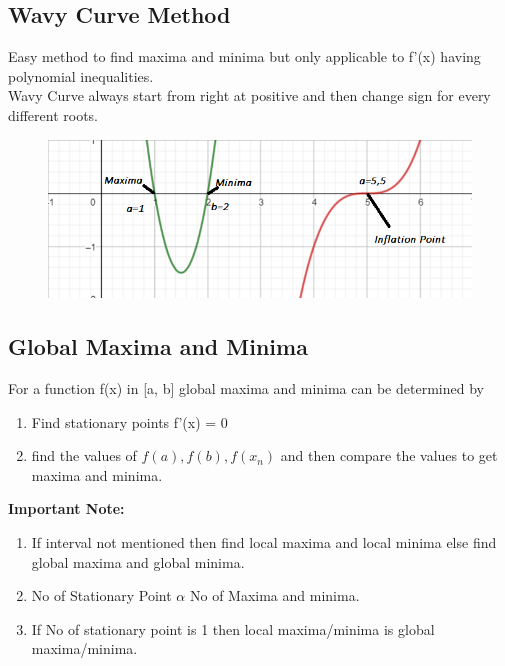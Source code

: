 \subsection*{Wavy Curve Method}
Easy method to find maxima and minima but only applicable to f'(x) having polynomial inequalities.\\
Wavy Curve always start from right at positive and then change sign for every different roots.
\begin{figure}[h!]
    \centering
    \includegraphics[width=\linewidth]{images/wavy-curve.png}
\end{figure}

\subsection*{Global Maxima and Minima}
For a function f(x) in [a, b] global maxima and minima can be determined by
\begin{enumerate}
    \item Find stationary points f'(x) = 0
    \item find the values of \(f(a), f(b), f(x_n)\) and then compare the values to get maxima and minima.
\end{enumerate}
\textbf{Important Note:}
\begin{enumerate}
    \item If interval not mentioned then find local maxima and local minima else find global maxima and global minima.
    \item No of Stationary Point \(\alpha\) No of Maxima and minima.
    \item If No of stationary point is 1 then local maxima/minima is global maxima/minima.
\end{enumerate}



